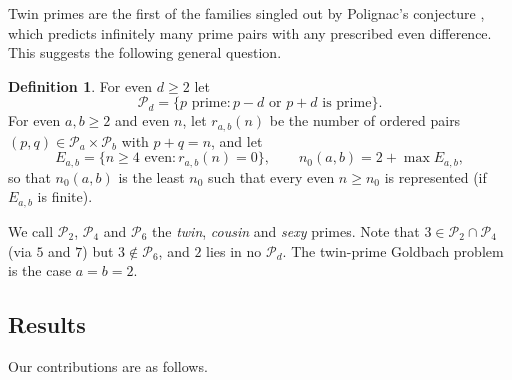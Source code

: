 \documentclass[11pt]{amsart}
\theoremstyle{definition}
\newtheorem{definition}[theorem]{Definition}
\theoremstyle{remark}
\newcommand{\PP}{\mathcal{P}}
\begin{document}
Twin primes are the first of the families singled out by Polignac's conjecture \cite{Polignac1849}, which predicts infinitely many prime pairs with any prescribed even difference. This suggests the following general question.

\begin{definition}\label{def:Pd}
For even $d\ge 2$ let
\[
\PP_d=\{p \text{ prime}: p-d \text{ or } p+d \text{ is prime}\}.
\]
For even $a,b\ge 2$ and even $n$, let $r_{a,b}(n)$ be the number of ordered pairs $(p,q)\in\PP_a\times\PP_b$ with $p+q=n$, and let
\[
E_{a,b}=\{n\ge 4 \text{ even}: r_{a,b}(n)=0\},\qquad n_0(a,b)=2+\max E_{a,b},
\]
so that $n_0(a,b)$ is the least $n_0$ such that every even $n\ge n_0$ is represented (if $E_{a,b}$ is finite).
\end{definition}

We call $\PP_2$, $\PP_4$ and $\PP_6$ the \emph{twin}, \emph{cousin} and \emph{sexy} primes. Note that $3\in\PP_2\cap\PP_4$ (via $5$ and $7$) but $3\notin\PP_6$, and $2$ lies in no $\PP_d$. The twin-prime Goldbach problem is the case $a=b=2$.

\subsection*{Results}
Our contributions are as follows.
\end{document}
